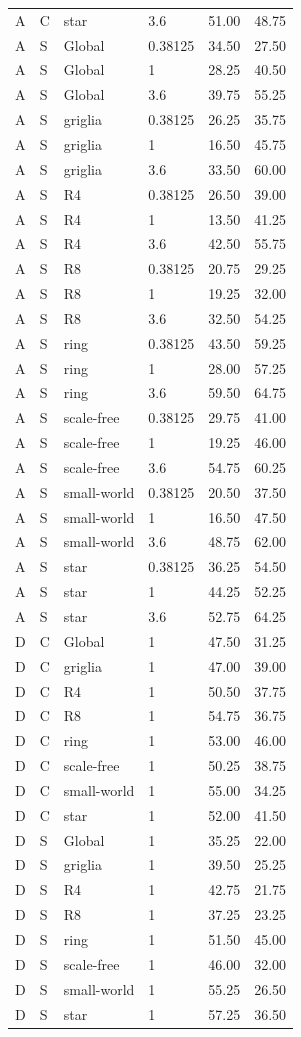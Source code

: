 \begin{longtable}{@{}llllrr@{}}
A & C & star & 3.6 & 51.00 & 48.75\\
A & S & Global & 0.38125 & 34.50 & 27.50\\
A & S & Global & 1 & 28.25 & 40.50\\
A & S & Global & 3.6 & 39.75 & 55.25\\
A & S & griglia & 0.38125 & 26.25 & 35.75\\
A & S & griglia & 1 & 16.50 & 45.75\\
A & S & griglia & 3.6 & 33.50 & 60.00\\
A & S & R4 & 0.38125 & 26.50 & 39.00\\
A & S & R4 & 1 & 13.50 & 41.25\\
A & S & R4 & 3.6 & 42.50 & 55.75\\
A & S & R8 & 0.38125 & 20.75 & 29.25\\
A & S & R8 & 1 & 19.25 & 32.00\\
A & S & R8 & 3.6 & 32.50 & 54.25\\
A & S & ring & 0.38125 & 43.50 & 59.25\\
A & S & ring & 1 & 28.00 & 57.25\\
A & S & ring & 3.6 & 59.50 & 64.75\\
A & S & scale-free & 0.38125 & 29.75 & 41.00\\
A & S & scale-free & 1 & 19.25 & 46.00\\
A & S & scale-free & 3.6 & 54.75 & 60.25\\
A & S & small-world & 0.38125 & 20.50 & 37.50\\
A & S & small-world & 1 & 16.50 & 47.50\\
A & S & small-world & 3.6 & 48.75 & 62.00\\
A & S & star & 0.38125 & 36.25 & 54.50\\
A & S & star & 1 & 44.25 & 52.25\\
A & S & star & 3.6 & 52.75 & 64.25\\
D & C & Global & 1 & 47.50 & 31.25\\
D & C & griglia & 1 & 47.00 & 39.00\\
D & C & R4 & 1 & 50.50 & 37.75\\
D & C & R8 & 1 & 54.75 & 36.75\\
D & C & ring & 1 & 53.00 & 46.00\\
D & C & scale-free & 1 & 50.25 & 38.75\\
D & C & small-world & 1 & 55.00 & 34.25\\
D & C & star & 1 & 52.00 & 41.50\\
D & S & Global & 1 & 35.25 & 22.00\\
D & S & griglia & 1 & 39.50 & 25.25\\
D & S & R4 & 1 & 42.75 & 21.75\\
D & S & R8 & 1 & 37.25 & 23.25\\
D & S & ring & 1 & 51.50 & 45.00\\
D & S & scale-free & 1 & 46.00 & 32.00\\
D & S & small-world & 1 & 55.25 & 26.50\\
D & S & star & 1 & 57.25 & 36.50\\
\end{longtable}\endgroup
